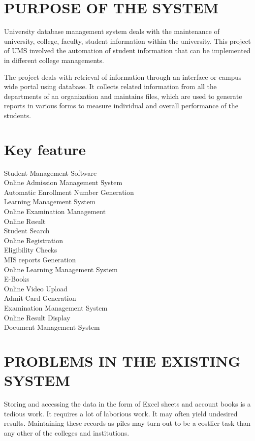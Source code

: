\documentclass[12pt,letterpaper]{article}
\begin{document}
\section{PURPOSE OF THE SYSTEM}

University database management system  deals with the maintenance of university, college, faculty, student information within the university. This project of UMS involved the automation of student information that can be implemented in different college managements. 

The project deals with retrieval of information through an interface or campus wide portal using database. It collects related information from all the departments of an organization and maintains files, which are used to generate reports in various forms to measure individual and overall performance of the students. 


\section{Key feature}
Student Management Software\\
Online Admission Management System\\
Automatic Enrollment Number Generation\\
Learning Management System\\
Online Examination Management\\
Online Result\\
Student Search\\
Online Registration\\
Eligibility Checks\\
MIS reports Generation\\
Online Learning Management System\\
E-Books\\
Online Video Upload\\
Admit Card Generation\\
Examination Management System\\
Online Result Display\\
Document Management System\\

\section{PROBLEMS IN THE EXISTING SYSTEM}
Storing and accessing the data in the form of Excel sheets and account books is a tedious work. It requires a lot of laborious work. It may often yield undesired results. Maintaining these records as piles may turn out to be a costlier task than any other of the colleges and institutions.
\end{document}
